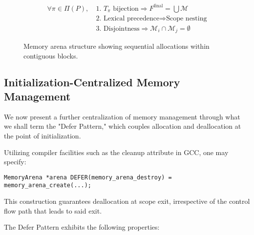 \begin{align*}
	\forall \pi \in \Pi(P),\  & \text{1. } T_\pi \text{ bijection} \Rightarrow F^{\text{final}} = \bigcup \mathcal{M} \\
	                          & \text{2. Lexical precedence} \Rightarrow \text{Scope nesting}                         \\
	                          & \text{3. Disjointness} \Rightarrow \mathcal{M}_i \cap \mathcal{M}_j = \emptyset
\end{align*}

\begin{figure}[h]
	\begin{center}
	\end{center}
	\caption{Memory arena structure showing sequential allocations within contiguous blocks.}
	\label{fig:memory-arena-illustration}
\end{figure}


\subsection{Initialization-Centralized Memory Management}
\label{subsec:Initialization-Centralized}
We now present a further centralization of memory management through what we shall term the "Defer Pattern," which couples allocation and deallocation at the point of initialization.

Utilizing compiler facilities such as the cleanup attribute in GCC, one may specify:

\begin{verbatim}
MemoryArena *arena DEFER(memory_arena_destroy) = memory_arena_create(...);
\end{verbatim}

This construction guarantees deallocation at scope exit, irrespective of the control flow path that leads to said exit.

The Defer Pattern exhibits the following properties:

